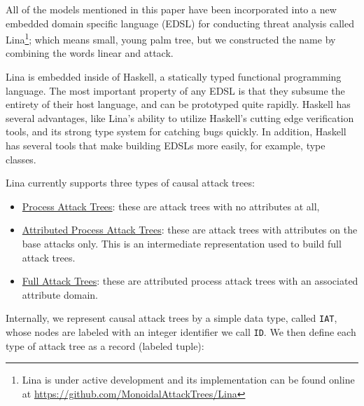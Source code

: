 All of the models mentioned in this paper have been incorporated into
a new embedded domain specific language (EDSL) for conducting threat
analysis called Lina\footnote{Lina is under active development and its
  implementation can be found online at
  \url{https://github.com/MonoidalAttackTrees/Lina}}; which means
small, young palm tree, but we constructed the name by combining the
words linear and attack.
 
Lina is embedded inside of Haskell, a statically typed functional
programming language.  The most important property of any EDSL is that
they subsume the entirety of their host language, and can be
prototyped quite rapidly.  Haskell has several advantages, like Lina's
ability to utilize Haskell's cutting edge verification tools, and its
strong type system for catching bugs quickly.  In addition, Haskell
has several tools that make building EDSLs more easily, for example,
type classes.

Lina currently supports three types of causal attack trees:
\begin{itemize}
\item \underline{Process Attack Trees}: these are attack trees with no attributes
  at all,
  
\item \underline{Attributed Process Attack Trees}: these are attack trees with
  attributes on the base attacks only.  This is an intermediate
  representation used to build full attack trees.
  
\item \underline{Full Attack Trees}: these are attributed process attack trees
  with an associated attribute domain.
\end{itemize}
\newcommand{\mh}[1]{\texttt{#1}} Internally, we represent
causal attack trees by a simple data type, called \mh{IAT}, whose
nodes are labeled with an integer identifier we call \mh{ID}.  We then
define each type of attack tree as a record (labeled tuple):

